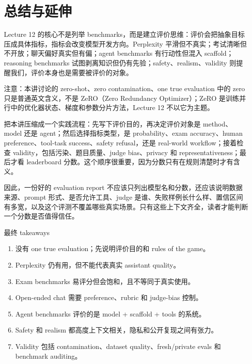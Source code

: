 \section{总结与延伸}

Lecture 12 的核心不是列举 benchmarks，而是建立评价思维：评价会把抽象目标压成具体指标，指标会改变模型开发方向。Perplexity 平滑但不真实；考试清晰但不开放；聊天偏好真实但有偏；agent benchmarks 有行动性但混入 scaffold；reasoning benchmarks 试图剥离知识但仍有先验；safety、realism、validity 则提醒我们，评价本身也是需要被评价的对象。

注意：本讲讨论的 zero-shot、zero contamination、one true evaluation 中的 zero 只是普通英文含义，不是 ZeRO（Zero Redundancy Optimizer）；ZeRO 是训练并行中的优化器状态、梯度和参数分片方法，Lecture 12 不以它为主题。

把本讲压缩成一个实践流程：先写下评价目的，再决定评价对象是 method、model 还是 agent；然后选择指标类型，是 probability、exam accuracy、human preference、tool-task success、safety refusal，还是 real-world workflow；接着检查 validity，包括污染、题目质量、judge bias、privacy 和 representativeness；最后才看 leaderboard 分数。这个顺序很重要，因为分数只有在规则清楚时才有含义。

因此，一份好的 evaluation report 不应该只列出模型名和分数，还应该说明数据来源、prompt 形式、是否允许工具、judge 是谁、失败样例长什么样、置信区间有多宽，以及这个评测不覆盖哪些真实场景。只有这些上下文齐全，读者才能判断一个分数是否值得信任。

\begin{importantbox}{最终 takeaways}
\begin{enumerate}
    \item 没有 one true evaluation；先说明评价目的和 rules of the game。
    \item Perplexity 仍有用，但不能代表真实 assistant quality。
    \item Exam benchmarks 易评分但会饱和，且不等同于真实使用。
    \item Open-ended chat 需要 preference、rubric 和 judge-bias 控制。
    \item Agent benchmarks 评价的是 model + scaffold + tools 的系统。
    \item Safety 和 realism 都高度上下文相关，隐私和公开复现之间有张力。
    \item Validity 包括 contamination、dataset quality、fresh/private evals 和 benchmark auditing。
\end{enumerate}
\end{importantbox}

